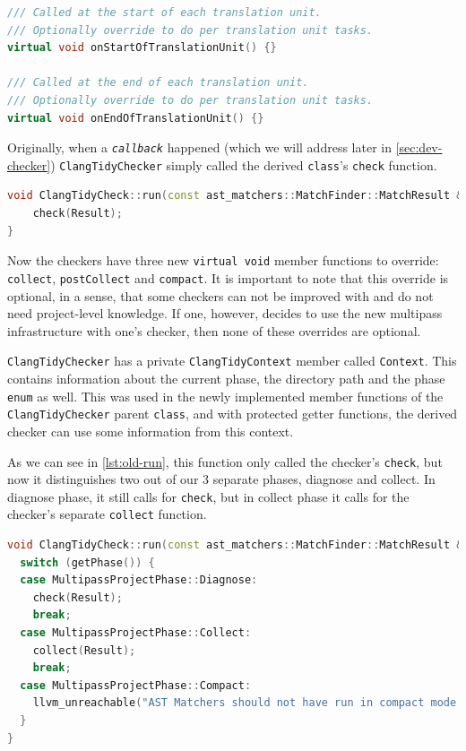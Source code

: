 \begin{lstlisting}[language={C++},caption={Virtual functions from MatchCallback's header.},label={lst:mc-single-virtual}]
/// Called at the start of each translation unit.
/// Optionally override to do per translation unit tasks.
virtual void onStartOfTranslationUnit() {}

/// Called at the end of each translation unit.
/// Optionally override to do per translation unit tasks.
virtual void onEndOfTranslationUnit() {}
\end{lstlisting}

Originally, when a \emph{\texttt{callback}} happened (which we will address later in \cref{sec:dev-checker})
\texttt{ClangTidyChecker} simply called the derived \lstinline{class}'s \texttt{check} function.

\begin{lstlisting}[language={C++},caption={The old infrastructure's way of calling check.},label={lst:old-run}]
void ClangTidyCheck::run(const ast_matchers::MatchFinder::MatchResult &Result) {
	check(Result);
}
\end{lstlisting}

Now the checkers have three new \lstinline{virtual void} member functions to override: \texttt{collect}, \texttt{postCollect}
and \texttt{compact}.
It is important to note that this override is optional, in a sense, that some checkers can not be improved with and do not need
project-level knowledge. If one, however, decides to use the new multipass infrastructure with one's checker, then none of these overrides
are optional.
 
\texttt{ClangTidyChecker} has a private \texttt{ClangTidyContext} member called \texttt{Context}.
This contains information about the current phase, the directory path and the
phase \lstinline{enum} as well. This was used in the newly implemented member functions of the \texttt{ClangTidyChecker}
parent \lstinline{class}, and with protected getter functions, the derived checker can use some information from this context.


As we can see in \cref{lst:old-run}, this function only called the checker's \texttt{check}, but now it distinguishes two
out of our 3 separate
phases, diagnose and collect. In diagnose phase, it still calls for \texttt{check}, but in collect phase it calls
for the checker's separate \texttt{collect} function.

\begin{lstlisting}[language={C++},caption={Run function distinguishing Diagnose and Collect phase.},label={lst:new-run}]
void ClangTidyCheck::run(const ast_matchers::MatchFinder::MatchResult &Result) {
  switch (getPhase()) {
  case MultipassProjectPhase::Diagnose:
    check(Result);
    break;
  case MultipassProjectPhase::Collect:
    collect(Result);
    break;
  case MultipassProjectPhase::Compact:
    llvm_unreachable("AST Matchers should not have run in compact mode.");
  }
}
\end{lstlisting}

